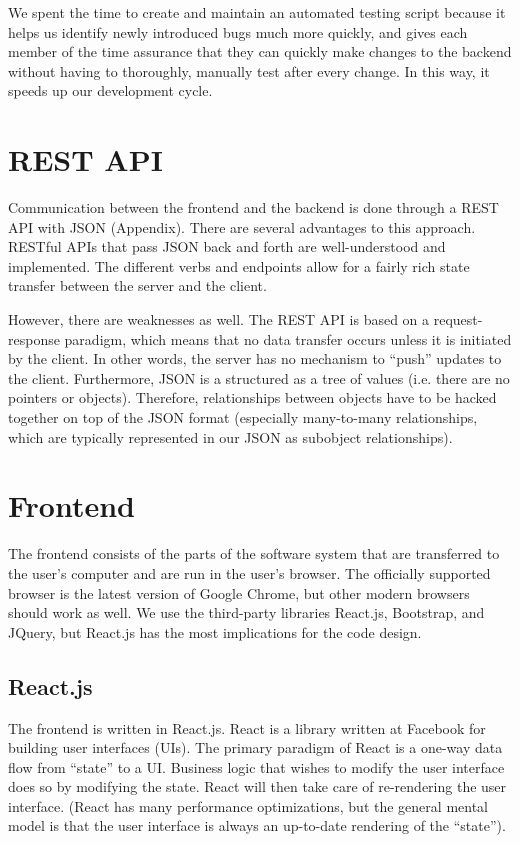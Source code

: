 \documentclass[12pt]{article}
\begin{document}
We spent the time to create and maintain an automated testing script because it helps us identify newly introduced bugs much more quickly, and gives each member of the time assurance that they can quickly make changes to the backend without having to thoroughly, manually test after every change. In this way, it speeds up our development cycle. 

\section{REST API}
Communication between the frontend and the backend is done through a REST API with JSON (Appendix). There are several advantages to this approach. RESTful APIs that pass JSON back and forth are well-understood and implemented. The different verbs and endpoints allow for a fairly rich state transfer between the server and the client.

However, there are weaknesses as well. The REST API is based on a request-response paradigm, which means that no data transfer occurs unless it is initiated by the client. In other words, the server has no mechanism to ``push'' updates to the client. Furthermore, JSON is a structured as a tree of values (i.e. there are no pointers or objects). Therefore, relationships between objects have to be hacked together on top of the JSON format (especially many-to-many relationships, which are typically represented in our JSON as subobject relationships).

\section{Frontend}
The frontend consists of the parts of the software system that are transferred to the user's computer and are run in the user's browser. The officially supported browser is the latest version of Google Chrome, but other modern browsers should work as well. We use the third-party libraries React.js, Bootstrap, and JQuery, but React.js has the most implications for the code design.

\subsection{React.js}
The frontend is written in React.js. React is a library written at Facebook for building user interfaces (UIs). The primary paradigm of React is a one-way data flow from ``state'' to a UI. Business logic that wishes to modify the user interface does so by modifying the state. React will then take care of re-rendering the user interface. (React has many performance optimizations, but the general mental model is that the user interface is always an up-to-date rendering of the ``state'').
\end{document}
